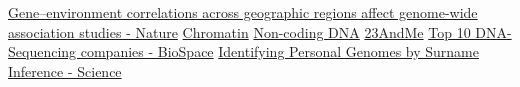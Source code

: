 \documentclass[12pt]{article}
\begin{document}
\begin{thebibliography}{10}
\href{https://www.nature.com/articles/s41588-022-01158-0}{Gene–environment correlations across geographic regions affect genome-wide association studies - Nature}
\href{https://en.wikipedia.org/wiki/Chromatin}{Chromatin}
\href{https://en.wikipedia.org/wiki/Non-coding_DNA}{Non-coding DNA}
\href{https://www.23andme.com/}{23AndMe}
\href{https://www.biospace.com/article/top-10-gene-sequencing-companies-by-revenue}{Top 10 DNA-Sequencing companies - BioSpace}
\href{https://www.science.org/doi/abs/10.1126/science.1229566}{Identifying Personal Genomes by Surname Inference - Science}
\end{thebibliography}
\end{document}
